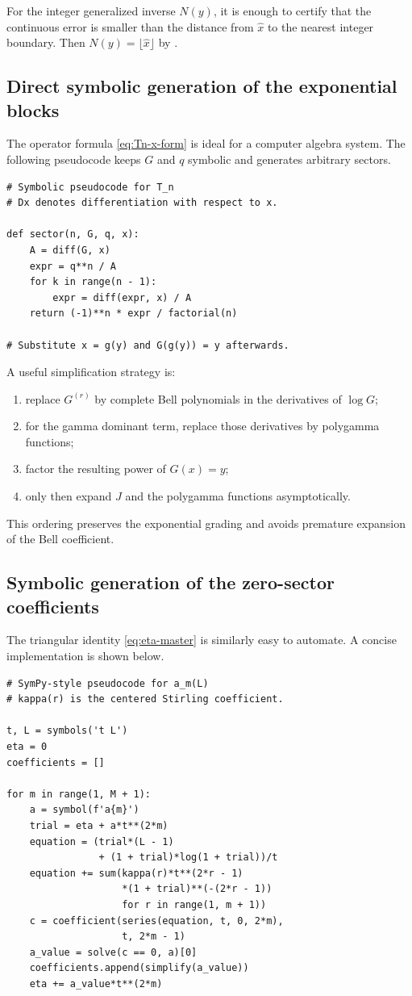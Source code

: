 \documentclass[11pt,oneside]{article}
\theoremstyle{plain}
\theoremstyle{definition}
\theoremstyle{remark}
\begin{document}
For the integer generalized inverse \(N(y)\), it is enough to certify that the
continuous error is smaller than the distance from \(\widehat{x}\) to the
nearest integer boundary.  Then \(N(y)=\lfloor\widehat{x}\rfloor\) by
.

\subsection{Direct symbolic generation of the exponential blocks}

The operator formula \eqref{eq:Tn-x-form} is ideal for a computer algebra
system.  The following pseudocode keeps \(G\) and \(q\) symbolic and generates
arbitrary sectors.

\begin{lstlisting}
# Symbolic pseudocode for T_n
# Dx denotes differentiation with respect to x.

def sector(n, G, q, x):
    A = diff(G, x)
    expr = q**n / A
    for k in range(n - 1):
        expr = diff(expr, x) / A
    return (-1)**n * expr / factorial(n)

# Substitute x = g(y) and G(g(y)) = y afterwards.
\end{lstlisting}

A useful simplification strategy is:
\begin{enumerate}
\item replace \(G^{(r)}\) by complete Bell polynomials in the derivatives of
\(\log G\);
\item for the gamma dominant term, replace those derivatives by polygamma
functions;
\item factor the resulting power of \(G(x)=y\);
\item only then expand \(J\) and the polygamma functions asymptotically.
\end{enumerate}
This ordering preserves the exponential grading and avoids premature
expansion of the Bell coefficient.

\subsection{Symbolic generation of the zero-sector coefficients}

The triangular identity \eqref{eq:eta-master} is similarly easy to automate.
A concise implementation is shown below.

\begin{lstlisting}
# SymPy-style pseudocode for a_m(L)
# kappa(r) is the centered Stirling coefficient.

t, L = symbols('t L')
eta = 0
coefficients = []

for m in range(1, M + 1):
    a = symbol(f'a{m}')
    trial = eta + a*t**(2*m)
    equation = (trial*(L - 1)
                + (1 + trial)*log(1 + trial))/t
    equation += sum(kappa(r)*t**(2*r - 1)
                    *(1 + trial)**(-(2*r - 1))
                    for r in range(1, m + 1))
    c = coefficient(series(equation, t, 0, 2*m),
                    t, 2*m - 1)
    a_value = solve(c == 0, a)[0]
    coefficients.append(simplify(a_value))
    eta += a_value*t**(2*m)
\end{lstlisting}
\end{document}
